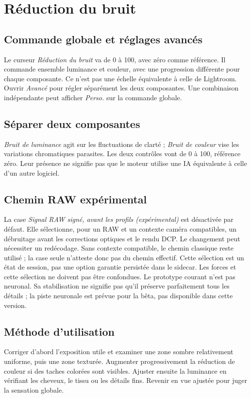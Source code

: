 \chapter{Réduction du bruit}
\section{Commande globale et réglages avancés}
Le curseur \emph{Réduction du bruit} va de 0 à 100, avec zéro comme référence.
Il commande ensemble luminance et couleur, avec une progression différente
pour chaque composante. Ce n'est pas une échelle équivalente à celle de Lightroom.
Ouvrir \emph{Avancé} pour régler séparément les deux composantes.
Une combinaison indépendante peut afficher \emph{Perso.} sur la commande globale.

\section{Séparer deux composantes}
\emph{Bruit de luminance} agit sur les fluctuations de clarté ;
\emph{Bruit de couleur} vise les variations chromatiques parasites.
Les deux contrôles vont de 0 à 100, référence zéro. Leur présence ne signifie
pas que le moteur utilise une IA équivalente à celle d’un autre logiciel.

\section{Chemin RAW expérimental}
La case \emph{Signal RAW signé, avant les profils (expérimental)} est désactivée
par défaut. Elle sélectionne, pour un RAW et un contexte caméra compatibles,
un débruitage avant les corrections optiques et le rendu DCP. Le changement
peut nécessiter un redécodage. Sans contexte compatible, le chemin classique
reste utilisé ; la case seule n'atteste donc pas du chemin effectif.
Cette sélection est un état de session, pas une option garantie persistée
dans le sidecar. Les forces et cette sélection ne doivent pas être confondues.
Le prototype courant n'est pas neuronal. Sa stabilisation ne signifie pas
qu'il préserve parfaitement tous les détails ; la piste neuronale est prévue
pour la bêta, pas disponible dans cette version.

\section{Méthode d’utilisation}
Corriger d’abord l’exposition utile et examiner une zone sombre relativement
uniforme, puis une zone texturée. Augmenter progressivement la réduction
de couleur si des taches colorées sont visibles. Ajuster ensuite la luminance
en vérifiant les cheveux, le tissu ou les détails fins. Revenir en vue ajustée
pour juger la sensation globale.


